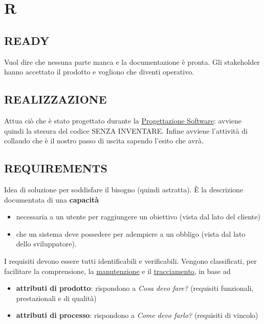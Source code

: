 \newpage
	\section{R} \label{sec:R}

		\subsection{READY}		\label{ready}
		Vuol dire che nessuna parte manca e la documentazione è pronta. Gli stakeholder hanno accettato il prodotto e vogliono che diventi operativo.

		\subsection{REALIZZAZIONE} 	\label{realizzazione}
		Attua ciò che è stato progettato durante la \underline{\hyperref[progettazione]{Progettazione Software}}: avviene quindi la stesura del codice SENZA INVENTARE. Infine avviene l'attività di collaudo che è il nostro passo di uscita sapendo l'esito che avrà.

		\subsection{REQUIREMENTS}  \label{requirements}
		Idea di soluzione per soddisfare il bisogno (quindi astratta).
		È la descrizione documentata di una \textbf{capacità}
		\begin{itemize}
			\item necessaria a un utente per raggiungere un obiettivo (vista dal lato del cliente)
			\item che un sistema deve possedere per adempiere a un obbligo (vista dal lato dello sviluppatore).
		\end{itemize}

	    I requisiti devono essere tutti identificabili e verificabili. Vengono classificati, per facilitare la comprensione, la \underline{\hyperref[manutenzione]{manutenzione}} e il \underline{\hyperref[tracciamento]{tracciamento}}, in base ad
	    	\begin{itemize}
	    		\item \textbf{attributi di prodotto}: rispondono a \textit{Cosa devo fare?} (requisiti funzionali, prestazionali e di qualità)
	    		\item \textbf{attributi di processo}: rispondono a \textit{Come devo farlo?} (requisiti di vincolo)
	    	\end{itemize}

